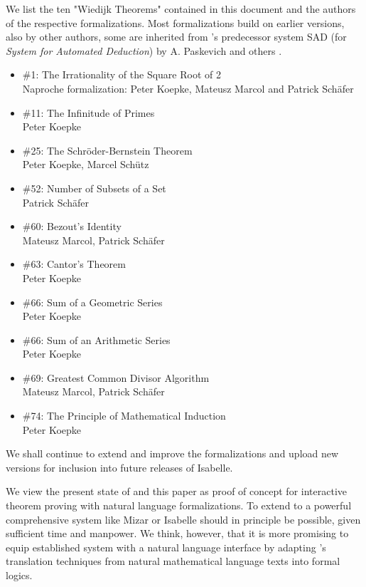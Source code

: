 \documentclass{article}
\begin{document}
We list the ten "Wiedijk Theorems" contained in this document and
the authors of the respective formalizations. Most formalizations build on
earlier versions, also by other authors, some are inherited from 
\Naproche's predecessor system
SAD (for \emph{System for Automated Deduction}) by A. Paskevich 
and others \cite{SAD}. 
\begin{itemize}
\item \#1: The Irrationality of the Square Root of 2\\
Naproche formalization: Peter Koepke, Mateusz Marcol and Patrick Schäfer
\item \#11: The Infinitude of Primes\\
Peter Koepke
\item \#25: The Schröder-Bernstein Theorem\\
Peter Koepke, Marcel Schütz
\item \#52: Number of Subsets of a Set\\
Patrick Schäfer
\item \#60: Bezout's Identity\\
Mateusz Marcol, Patrick Schäfer
\item \#63: Cantor's Theorem\\
Peter Koepke
\item \#66: Sum of a Geometric Series\\
Peter Koepke
\item \#66: Sum of an Arithmetic Series\\
Peter Koepke
\item \#69: Greatest Common Divisor Algorithm\\
Mateusz Marcol, Patrick Schäfer
\item \#74: The Principle of Mathematical Induction\\
Peter Koepke
\end{itemize}
We shall continue to extend and improve the formalizations and upload
new versions for inclusion into future releases of Isabelle.

We view the present state of \Naproche{} and this paper as proof of 
concept for interactive theorem
proving with natural language formalizations. 
To extend \Naproche{} to a powerful comprehensive
system like Mizar or Isabelle should in principle be possible, 
given sufficient time and manpower.
We think, however, that it is more promising to equip established
system with a natural language interface by adapting 
\Naproche's translation techniques
from natural mathematical language texts into formal logics.
\end{document}
